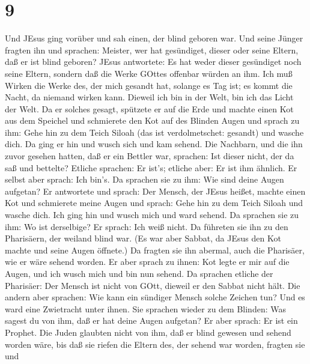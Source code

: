 \hypertarget{section-8}{%
\section{9}\label{section-8}}

 Und JEsus ging vorüber und sah einen, der blind geboren
war.  Und seine Jünger fragten ihn und sprachen: Meister,
wer hat gesündiget, dieser oder seine Eltern, daß er ist blind geboren?
 JEsus antwortete: Es hat weder dieser gesündiget noch seine
Eltern, sondern daß die Werke GOttes offenbar würden an ihm.
 Ich muß Wirken die Werke des, der mich gesandt hat, solange
es Tag ist; es kommt die Nacht, da niemand wirken kann. 
Dieweil ich bin in der Welt, bin ich das Licht der Welt.  Da
er solches gesagt, spützete er auf die Erde und machte einen Kot aus dem
Speichel und schmierete den Kot auf des Blinden Augen  und
sprach zu ihm: Gehe hin zu dem Teich Siloah (das ist verdolmetschet:
gesandt) und wasche dich. Da ging er hin und wusch sich und kam sehend.
 Die Nachbarn, und die ihn zuvor gesehen hatten, daß er ein
Bettler war, sprachen: Ist dieser nicht, der da saß und bettelte?
 Etliche sprachen: Er ist's; etliche aber: Er ist ihm
ähnlich. Er selbst aber sprach: Ich bin's.  Da sprachen sie
zu ihm: Wie sind deine Augen aufgetan?  Er antwortete und
sprach: Der Mensch, der JEsus heißet, machte einen Kot und schmierete
meine Augen und sprach: Gehe hin zu dem Teich Siloah und wasche dich.
Ich ging hin und wusch mich und ward sehend.  Da sprachen
sie zu ihm: Wo ist derselbige? Er sprach: Ich weiß nicht. 
Da führeten sie ihn zu den Pharisäern, der weiland blind war.
 (Es war aber Sabbat, da JEsus den Kot machte und seine
Augen öffnete.)  Da fragten sie ihn abermal, auch die
Pharisäer, wie er wäre sehend worden. Er aber sprach zu ihnen: Kot legte
er mir auf die Augen, und ich wusch mich und bin nun sehend.
 Da sprachen etliche der Pharisäer: Der Mensch ist nicht
von GOtt, dieweil er den Sabbat nicht hält. Die andern aber sprachen:
Wie kann ein sündiger Mensch solche Zeichen tun? Und es ward eine
Zwietracht unter ihnen.  Sie sprachen wieder zu dem
Blinden: Was sagest du von ihm, daß er hat deine Augen aufgetan? Er aber
sprach: Er ist ein Prophet.  Die Juden glaubten nicht von
ihm, daß er blind gewesen und sehend worden wäre, bis daß sie riefen die
Eltern des, der sehend war worden,  fragten sie und

